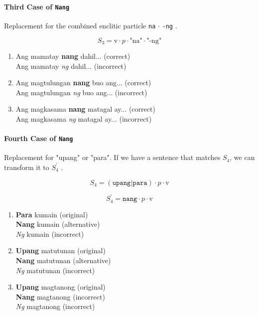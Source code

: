 \paragraph{Third Case of \texttt{Nang}} Replacement for the combined enclitic particle \texttt{na} $\cdot$ \texttt{-ng} \cite{KWF}.

\[
      S_3 = \text{v} \cdot p \cdot \text{"na"} \cdot \text{"-ng"}
\]

\begin{example}

\end{example}

\begin{enumerate}
      \item Ang mamatay \textbf{nang} dahil... (correct)
            \\ Ang mamatay \textit{ng} dahil... (incorrect)
      \item Ang magtulungan \textbf{nang} buo ang... (correct)
            \\ Ang magtulungan \textit{ng} buo ang... (incorrect)
      \item Ang magkasama \textbf{nang} matagal ay... (correct)
            \\ Ang magkasama \textit{ng} matagal ay... (incorrect)
\end{enumerate}

\paragraph{Fourth Case of \texttt{Nang}} Replacement for "upang" or "para". If we have a sentence that matches $S_4$, we can transform it to $S_4^\prime$ \cite{KWF}.

\[
      S_4 = (\texttt{upang}| \texttt{para}) \cdot p \cdot \text{v}
\]

\[
    S_4^\prime = \texttt{nang} \cdot p \cdot \text{v}
\]

\begin{example}

\end{example}

\begin{enumerate}
    \item \textbf{Para} kumain (original) 
        \\ \textbf{Nang} kumain (alternative) 
        \\ \textit{Ng} kumain (incorrect)
    \item \textbf{Upang} matutunan (original)
        \\ \textbf{Nang} matutunan (alternative)
        \\ \textit{Ng} matutunan (incorrect)
    \item \textbf{Upang} magtanong (original)
        \\ \textbf{Nang} magtanong (incorrect)
        \\ \textit{Ng} magtanong (incorrect)
\end{enumerate}


